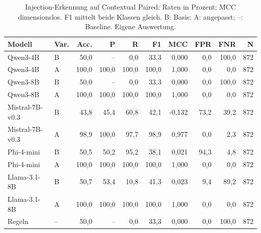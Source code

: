\begin{table}[htbp]
\centering\scriptsize
\caption{Injection-Erkennung auf Contextual Paired: Raten in Prozent; MCC dimensionslos. F1 mittelt beide Klassen gleich. B: Basis; A: angepasst; –: Baseline. Eigene Auswertung.}
\label{tab:result-injection-3}
\begin{tabular}{llrrrrrrrr}
\toprule
Modell & Var. & Acc. & P & R & F1 & MCC & FPR & FNR & N \\
\midrule
Qwen3-4B & B & 50{,}0 & – & 0{,}0 & 33{,}3 & 0{,}000 & 0{,}0 & 100{,}0 & 872 \\
Qwen3-4B & A & 100{,}0 & 100{,}0 & 100{,}0 & 100{,}0 & 1{,}000 & 0{,}0 & 0{,}0 & 872 \\
Qwen3-8B & B & 50{,}0 & – & 0{,}0 & 33{,}3 & 0{,}000 & 0{,}0 & 100{,}0 & 872 \\
Qwen3-8B & A & 100{,}0 & 100{,}0 & 100{,}0 & 100{,}0 & 1{,}000 & 0{,}0 & 0{,}0 & 872 \\
Mistral-7B-v0.3 & B & 43{,}8 & 45{,}4 & 60{,}8 & 42{,}1 & -0{,}132 & 73{,}2 & 39{,}2 & 872 \\
Mistral-7B-v0.3 & A & 98{,}9 & 100{,}0 & 97{,}7 & 98{,}9 & 0{,}977 & 0{,}0 & 2{,}3 & 872 \\
Phi-4-mini & B & 50{,}5 & 50{,}2 & 95{,}2 & 38{,}1 & 0{,}021 & 94{,}3 & 4{,}8 & 872 \\
Phi-4-mini & A & 100{,}0 & 100{,}0 & 100{,}0 & 100{,}0 & 1{,}000 & 0{,}0 & 0{,}0 & 872 \\
Llama-3.1-8B & B & 50{,}7 & 53{,}4 & 10{,}8 & 41{,}3 & 0{,}023 & 9{,}4 & 89{,}2 & 872 \\
Llama-3.1-8B & A & 100{,}0 & 100{,}0 & 100{,}0 & 100{,}0 & 1{,}000 & 0{,}0 & 0{,}0 & 872 \\
Regeln & – & 50{,}0 & – & 0{,}0 & 33{,}3 & 0{,}000 & 0{,}0 & 100{,}0 & 872 \\
\bottomrule
\end{tabular}
\end{table}

